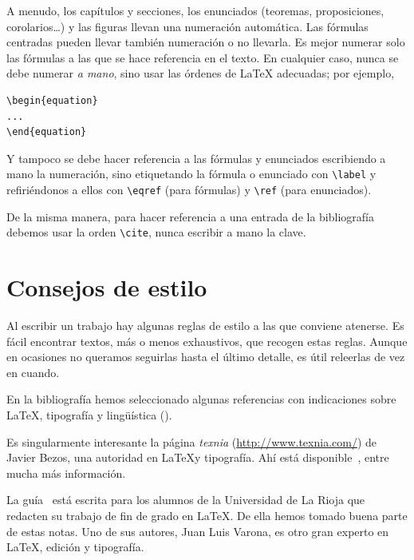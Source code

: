 \documentclass[11pt]{book}
\theoremstyle{plain} %
\theoremstyle{definition} %
\begin{document}
A menudo, los capítulos y secciones, los enunciados (teoremas, proposiciones, 
corolarios\dots) y las figuras llevan una numeración 
automática. Las fórmulas centradas pueden llevar 
también numeración o no llevarla. Es mejor numerar solo las fórmulas a las que se 
hace referencia en el texto. En cualquier caso, nunca se debe numerar \emph{a 
mano}, sino usar las órdenes de {\LaTeX} adecuadas; por ejemplo,
\begin{verbatim}
\begin{equation}
...
\end{equation}
\end{verbatim}
Y tampoco se debe hacer referencia a las fórmulas y enunciados escribiendo a mano 
la numeración, sino etiquetando la fórmula o enunciado con \verb"\label"  y 
refiriéndonos a ellos con \verb"\eqref" (para fórmulas) y \verb"\ref" (para 
enunciados).

De la misma manera, para hacer referencia a una entrada de la bibliografía 
debemos usar la orden \verb"\cite", nunca escribir a mano la clave.

\section{Consejos de estilo}

Al escribir un trabajo hay algunas reglas de estilo a las que conviene atenerse. 
Es fácil encontrar textos, más o menos exhaustivos, que recogen estas reglas. 
Aunque en ocasiones no queramos seguirlas hasta el último detalle, es útil 
releerlas de vez en cuando.

En la bibliografía hemos seleccionado algunas referencias con indicaciones sobre 
{\LaTeX}, tipografía y lingüística (\cite{ALV,B,RAE}).

Es singularmente interesante la página \emph{texnia}
(\url{http://www.texnia.com/}) de Javier Bezos, una autoridad en \LaTeX y tipografía. Ahí está 
disponible~\cite{B}, entre mucha más información.

La guía~\cite{ALV} está escrita para los alumnos de la Universidad de La Rioja que redacten su 
trabajo de fin de grado en \LaTeX. De ella hemos tomado buena parte de estas notas. Uno de sus 
autores, Juan Luis Varona, es otro gran experto en {\LaTeX}, edición y tipografía.

\end{document}
